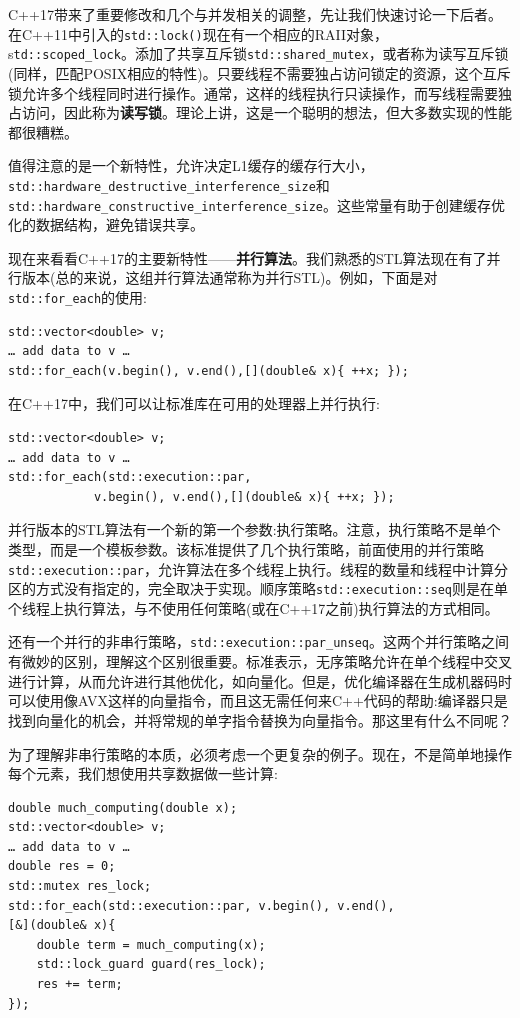 C++17带来了重要修改和几个与并发相关的调整，先让我们快速讨论一下后者。在C++11中引入的\texttt{std::lock()}现在有一个相应的RAII对象，s\texttt{td::scoped\_lock}。添加了共享互斥锁\texttt{std::shared\_mutex}，或者称为读写互斥锁(同样，匹配POSIX相应的特性)。只要线程不需要独占访问锁定的资源，这个互斥锁允许多个线程同时进行操作。通常，这样的线程执行只读操作，而写线程需要独占访问，因此称为\textbf{读写锁}。理论上讲，这是一个聪明的想法，但大多数实现的性能都很糟糕。

值得注意的是一个新特性，允许决定L1缓存的缓存行大小，\texttt{std::hardware\_destructive\_interference\_size}和\texttt{std::hardware\_constructive\_interference\_size}。这些常量有助于创建缓存优化的数据结构，避免错误共享。

现在来看看C++17的主要新特性——\textbf{并行算法}。我们熟悉的STL算法现在有了并行版本(总的来说，这组并行算法通常称为并行STL)。例如，下面是对\texttt{std::for\_each}的使用:

\begin{lstlisting}[style=styleCXX]
std::vector<double> v;
… add data to v … 
std::for_each(v.begin(), v.end(),[](double& x){ ++x; });
\end{lstlisting}

在C++17中，我们可以让标准库在可用的处理器上并行执行:

\begin{lstlisting}[style=styleCXX]
std::vector<double> v;
… add data to v … 
std::for_each(std::execution::par,
			v.begin(), v.end(),[](double& x){ ++x; });
\end{lstlisting}

并行版本的STL算法有一个新的第一个参数:执行策略。注意，执行策略不是单个类型，而是一个模板参数。该标准提供了几个执行策略，前面使用的并行策略\texttt{std::execution::par}，允许算法在多个线程上执行。线程的数量和线程中计算分区的方式没有指定的，完全取决于实现。顺序策略\texttt{std::execution::seq}则是在单个线程上执行算法，与不使用任何策略(或在C++17之前)执行算法的方式相同。

还有一个并行的非串行策略，\texttt{std::execution::par\_unseq}。这两个并行策略之间有微妙的区别，理解这个区别很重要。标准表示，无序策略允许在单个线程中交叉进行计算，从而允许进行其他优化，如向量化。但是，优化编译器在生成机器码时可以使用像AVX这样的向量指令，而且这无需任何来C++代码的帮助:编译器只是找到向量化的机会，并将常规的单字指令替换为向量指令。那这里有什么不同呢？

为了理解非串行策略的本质，必须考虑一个更复杂的例子。现在，不是简单地操作每个元素，我们想使用共享数据做一些计算:

\begin{lstlisting}[style=styleCXX]
double much_computing(double x);
std::vector<double> v;
… add data to v … 
double res = 0;
std::mutex res_lock;
std::for_each(std::execution::par, v.begin(), v.end(),
[&](double& x){ 
	double term = much_computing(x);
	std::lock_guard guard(res_lock);
	res += term;
});
\end{lstlisting}

